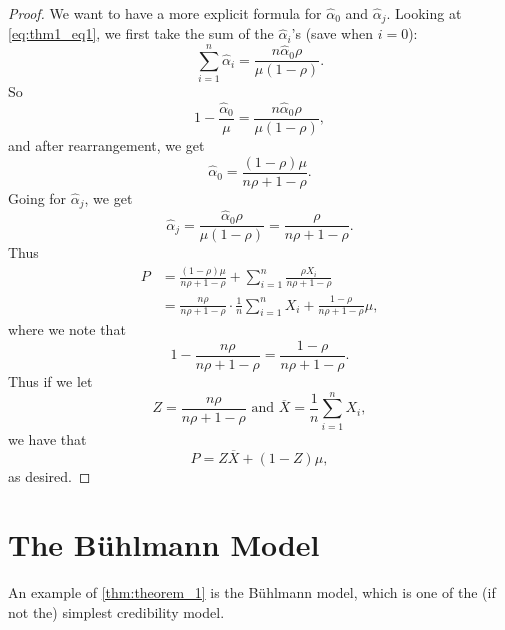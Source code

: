 \documentclass[notoc,notitlepage]{tufte-book}
\begin{document}
\begin{proof}
  We want to have a more explicit formula for $\hat{\alpha}_0$ and
  $\hat{\alpha}_j$. Looking at \cref{eq:thm1_eq1}, we first take the sum of the
  $\hat{\alpha}_i$'s (save when $i = 0$):
  \begin{equation*}
    \sum_{i=1}^{n} \hat{\alpha}_i = \frac{ n\hat{\alpha}_0 \rho }{\mu(1 -
    \rho)}.
  \end{equation*}
  So
  \begin{equation*}
    1 - \frac{\hat{\alpha}_0}{\mu} = \frac{ n\hat{\alpha}_0 \rho }{\mu(1 -
    \rho)},
  \end{equation*}
  and after rearrangement, we get
  \begin{equation*}
    \hat{\alpha}_0 = \frac{(1-\rho)\mu}{n \rho + 1 - \rho}.
  \end{equation*}
  Going for $\hat{\alpha}_j$, we get
  \begin{equation*}
    \hat{\alpha}_j = \frac{\hat{\alpha}_0 \rho}{\mu(1 - \rho)}
                   = \frac{\rho}{n \rho + 1 - \rho}.
  \end{equation*}
  Thus
  \begin{align*}
    P &= \frac{(1-\rho)\mu}{n \rho + 1 - \rho} +
        \sum_{i=1}^{n} \frac{\rho X_i}{n \rho + 1 - \rho} \\
      &= \frac{n\rho}{n\rho + 1 - \rho} \cdot \frac{1}{n} \sum_{i=1}^{n} X_i
        + \frac{1 - \rho}{n\rho + 1 - \rho} \mu,
  \end{align*}
  where we note that
  \begin{equation*}
    1 - \frac{n\rho}{n\rho + 1 - \rho} = \frac{1 - \rho}{n\rho + 1 - \rho}.
  \end{equation*}
  Thus if we let
  \begin{equation*}
    Z = \frac{n\rho}{n\rho + 1 - \rho} \text{ and }
    \overline{X} = \frac{1}{n} \sum_{i=1}^{n} X_i,
  \end{equation*}
  we have that
  \begin{equation*}
    P = Z \overline{X} + (1 - Z) \mu,
  \end{equation*}
  as desired.
\end{proof}


\section{The B\"{u}hlmann Model}%
\label{sec:the_buhlmann_model}

An example of \cref{thm:theorem_1} is the B\"{u}hlmann model, which is one of
the (if not the) simplest credibility model.
\end{document}
